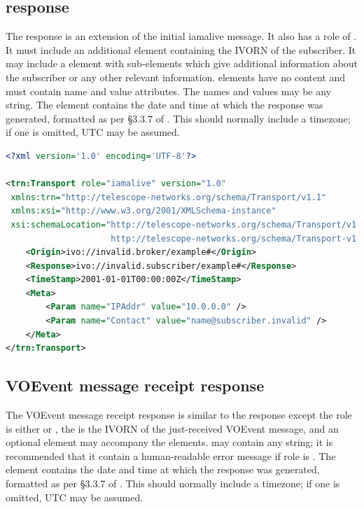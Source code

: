 \documentclass[a4paper,11pt]{ivoa}
\begin{document}
\subsection{ response}
\label{sec:transport:iamaliveresponse}

The  response is an extension of the initial iamalive
message. It also has a role of . It must include an
additional  element containing the IVORN of the
subscriber.  It may include a  element with
 sub-elements which give additional information about the
subscriber or any other relevant information.  elements have
no content and must contain name and value attributes. The names and values
may be any string. The  element contains the date and
time at which the response was generated, formatted as per \S3.3.7 of
\citet{Peterson:2012}. This should normally include a timezone; if one is
omitted, UTC may be assumed.

\begin{lstlisting}[language=XML,caption=Sample \xmlel{iamalive} response.,
                   label=lst:iamaliveresponse]
<?xml version='1.0' encoding='UTF-8'?>

<trn:Transport role="iamalive" version="1.0"
 xmlns:trn="http://telescope-networks.org/schema/Transport/v1.1"
 xmlns:xsi="http://www.w3.org/2001/XMLSchema-instance"
 xsi:schemaLocation="http://telescope-networks.org/schema/Transport/v1.1
                     http://telescope-networks.org/schema/Transport-v1.1.xsd">
    <Origin>ivo://invalid.broker/example#</Origin>
    <Response>ivo://invalid.subscriber/example#</Response>
    <TimeStamp>2001-01-01T00:00:00Z</TimeStamp>
    <Meta>
        <Param name="IPAddr" value="10.0.0.0" />
        <Param name="Contact" value="name@subscriber.invalid" />
    </Meta>
</trn:Transport>
\end{lstlisting}

\subsection{VOEvent message receipt response}
\label{sec:transport:ack}

The VOEvent message receipt response is similar to the 
response except the role is either  or , the
 is the IVORN of the just-received VOEvent message, and an
optional  element may accompany the 
elements.  may contain any string; it is recommended that
it contain a human-readable error message if role is . The
 element contains the date and time at which the
response was generated, formatted as per \S3.3.7 of \citet{Peterson:2012}.
This should normally include a timezone; if one is omitted, UTC may be
assumed.
\end{document}
